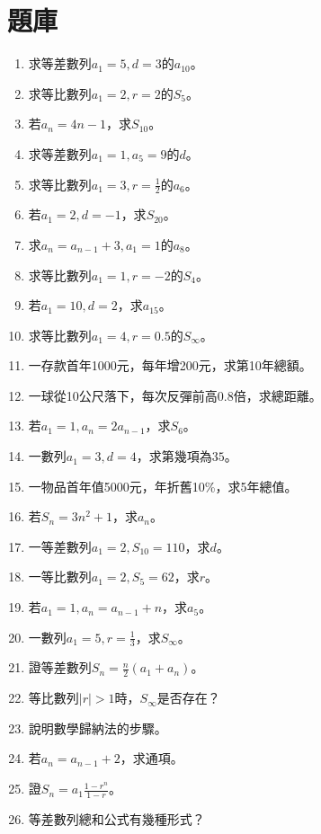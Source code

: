 \section{題庫}
\begin{enumerate}[label=\arabic*.]
    \item 求等差數列$a_1 = 5, d = 3$的$a_{10}$。
    \item 求等比數列$a_1 = 2, r = 2$的$S_5$。
    \item 若$a_n = 4n - 1$，求$S_{10}$。
    \item 求等差數列$a_1 = 1, a_5 = 9$的$d$。
    \item 求等比數列$a_1 = 3, r = \frac{1}{2}$的$a_6$。
    \item 若$a_1 = 2, d = -1$，求$S_{20}$。
    \item 求$a_n = a_{n-1} + 3, a_1 = 1$的$a_8$。
    \item 求等比數列$a_1 = 1, r = -2$的$S_4$。
    \item 若$a_1 = 10, d = 2$，求$a_{15}$。
    \item 求等比數列$a_1 = 4, r = 0.5$的$S_\infty$。
    \item 一存款首年1000元，每年增200元，求第10年總額。
    \item 一球從10公尺落下，每次反彈前高0.8倍，求總距離。
    \item 若$a_1 = 1, a_n = 2a_{n-1}$，求$S_6$。
    \item 一數列$a_1 = 3, d = 4$，求第幾項為$35$。
    \item 一物品首年值5000元，年折舊10\%，求5年總值。
    \item 若$S_n = 3n^2 + 1$，求$a_n$。
    \item 一等差數列$a_1 = 2, S_{10} = 110$，求$d$。
    \item 一等比數列$a_1 = 2, S_5 = 62$，求$r$。
    \item 若$a_1 = 1, a_n = a_{n-1} + n$，求$a_5$。
    \item 一數列$a_1 = 5, r = \frac{1}{3}$，求$S_\infty$。
    \item 證等差數列$S_n = \frac{n}{2} (a_1 + a_n)$。
    \item 等比數列$|r| > 1$時，$S_\infty$是否存在？
    \item 說明數學歸納法的步驟。
    \item 若$a_n = a_{n-1} + 2$，求通項。
    \item 證$S_n = a_1 \frac{1 - r^n}{1 - r}$。
    \item 等差數列總和公式有幾種形式？

\end{enumerate}
